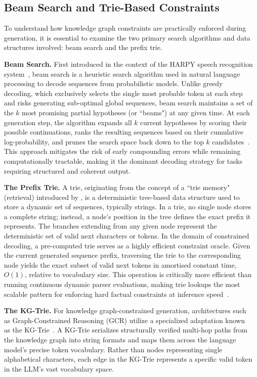 \subsection{Beam Search and Trie-Based Constraints}

To understand how knowledge graph constraints are practically enforced during generation, it is essential to examine the two primary search algorithms and data structures involved: beam search and the prefix trie.

\textbf{Beam Search.} First introduced in the context of the HARPY speech recognition system~\citep{lowerre1976harpy}, beam search is a heuristic search algorithm used in natural language processing to decode sequences from probabilistic models. Unlike greedy decoding, which exclusively selects the single most probable token at each step and risks generating sub-optimal global sequences, beam search maintains a set of the $k$ most promising partial hypotheses (or ``beams") at any given time. At each generation step, the algorithm expands all $k$ current hypotheses by scoring their possible continuations, ranks the resulting sequences based on their cumulative log-probability, and prunes the search space back down to the top $k$ candidates~\citep{holtzman2020curious}. This approach mitigates the risk of early compounding errors while remaining computationally tractable, making it the dominant decoding strategy for tasks requiring structured and coherent output.

\textbf{The Prefix Trie.} A trie, originating from the concept of a ``trie memory" (retrieval) introduced by \citet{fredkin1960trie}, is a deterministic tree-based data structure used to store a dynamic set of sequences, typically strings. In a trie, no single node stores a complete string; instead, a node's position in the tree defines the exact prefix it represents. The branches extending from any given node represent the deterministic set of valid next characters or tokens. In the domain of constrained decoding, a pre-computed trie serves as a highly efficient constraint oracle. Given the current generated sequence prefix, traversing the trie to the corresponding node yields the exact subset of valid next tokens in amortised constant time, $O(1)$, relative to vocabulary size. This operation is critically more efficient than running continuous dynamic parser evaluations, making trie lookups the most scalable pattern for enforcing hard factual constraints at inference speed~\citep{willard2023outlines}.

\textbf{The KG-Trie.} For knowledge graph-constrained generation, architectures such as Graph-Constrained Reasoning (GCR) utilize a specialized adaptation known as the KG-Trie~\citep{luo2024gcr}. A KG-Trie serializes structurally verified multi-hop paths from the knowledge graph into string formats and maps them across the language model's precise token vocabulary. Rather than nodes representing single alphabetical characters, each edge in the KG-Trie represents a specific valid token in the LLM's vast vocabulary space.

